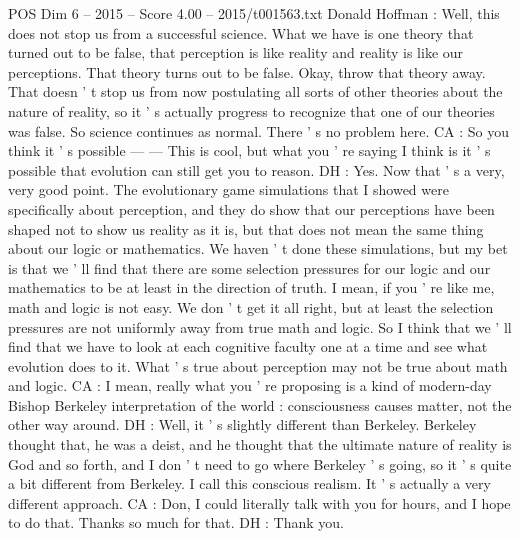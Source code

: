 \begin{textsample}{POS Dim 6 – 2015 – Score 4.00 – 2015/t001563.txt}
Donald Hoffman : Well, this does not stop us from a successful science.
What we have is one theory that turned out to be false, that perception is like reality and reality is like our perceptions.
That theory turns out to be false.
Okay, throw that theory away.
That doesn ' t stop us from now postulating all sorts of other theories about the nature of reality, so it ' s actually progress to recognize that one of our theories was false.
So science continues as normal.
There ' s no problem here.
CA : So you think it ' s possible — — This is cool, but what you ' re saying I think is it ' s possible that evolution can still get you to reason.
DH : Yes.
Now that ' s a very, very good point.
The evolutionary game simulations that I showed were specifically about perception, and they do show that our perceptions have been shaped not to show us reality as it is, but that does not mean the same thing about our logic or mathematics.
We haven ' t done these simulations, but my bet is that we ' ll find that there are some selection pressures for our logic and our mathematics to be at least in the direction of truth.
I mean, if you ' re like me, math and logic is not easy.
We don ' t get it all right, but at least the selection pressures are not uniformly away from true math and logic.
So I think that we ' ll find that we have to look at each cognitive faculty one at a time and see what evolution does to it.
What ' s true about perception may not be true about math and logic.
CA : I mean, really what you ' re proposing is a kind of modern-day Bishop Berkeley interpretation of the world : consciousness causes matter, not the other way around.
DH : Well, it ' s slightly different than Berkeley.
Berkeley thought that, he was a deist, and he thought that the ultimate nature of reality is God and so forth, and I don ' t need to go where Berkeley ' s going, so it ' s quite a bit different from Berkeley.
I call this conscious realism.
It ' s actually a very different approach.
CA : Don, I could literally talk with you for hours, and I hope to do that.
Thanks so much for that.
DH : Thank you.

\end{textsample}
